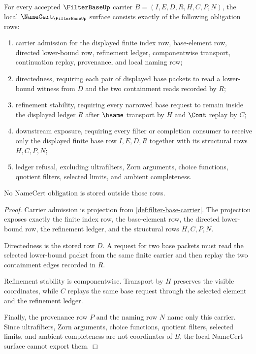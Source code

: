 \begin{theorem}
\label{thm:filter-base-namecert-obligations}
For every accepted $\FilterBaseUp$ carrier $B=(I,E,D,R,H,C,P,N)$, the local $\NameCert_{\FilterBaseUp}$ surface consists exactly of the following obligation rows:
\begin{enumerate}
\item carrier admission for the displayed finite index row, base-element row, directed lower-bound row, refinement ledger, componentwise transport, continuation replay, provenance, and local naming row;
\item directedness, requiring each pair of displayed base packets to read a lower-bound witness from $D$ and the two containment reads recorded by $R$;
\item refinement stability, requiring every narrowed base request to remain inside the displayed ledger $R$ after $\hsame$ transport by $H$ and $\Cont$ replay by $C$;
\item downstream exposure, requiring every filter or completion consumer to receive only the displayed finite base row $I,E,D,R$ together with its structural rows $H,C,P,N$;
\item ledger refusal, excluding ultrafilters, Zorn arguments, choice functions, quotient filters, selected limits, and ambient completeness.
\end{enumerate}
No NameCert obligation is stored outside those rows.
\end{theorem}
\begin{proof}
Carrier admission is projection from \autoref{def:filter-base-carrier}. The projection exposes exactly the finite index row, the base-element row, the directed lower-bound row, the refinement ledger, and the structural rows $H,C,P,N$.

Directedness is the stored row $D$. A request for two base packets must read the selected lower-bound packet from the same finite carrier and then replay the two containment edges recorded in $R$.

Refinement stability is componentwise. Transport by $H$ preserves the visible coordinates, while $C$ replays the same base request through the selected element and the refinement ledger.

Finally, the provenance row $P$ and the naming row $N$ name only this carrier. Since ultrafilters, Zorn arguments, choice functions, quotient filters, selected limits, and ambient completeness are not coordinates of $B$, the local NameCert surface cannot export them.
\end{proof}

